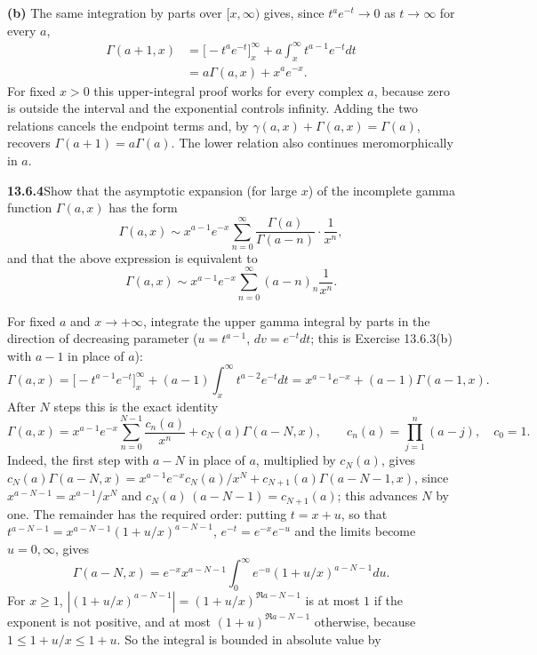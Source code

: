 \textbf{(b)} The same integration by parts over $[x,\infty)$
gives, since $t^ae^{-t}\to0$ as $t\to\infty$ for every $a$,
\begin{align*}
\Gamma(a+1,x)
&=\bigl[-t^ae^{-t}\bigr]_x^\infty
+a\int_x^\infty t^{a-1}e^{-t}dt\\
&=\boxed{a\Gamma(a,x)+x^ae^{-x}}.
\end{align*}
For fixed $x>0$ this upper-integral proof works for every
complex $a$, because zero is outside the interval and the
exponential controls infinity.  Adding the two relations cancels
the endpoint terms and, by $\gamma(a,x)+\Gamma(a,x)=\Gamma(a)$,
recovers $\Gamma(a+1)=a\Gamma(a)$.
The lower relation also continues meromorphically in $a$.


\par\bigskip
\noindent\textbf{13.6.4}\quad Show that the asymptotic expansion (for large
$x$) of the incomplete gamma function $\Gamma(a,x)$ has the form
\[
\Gamma(a,x)\sim x^{a-1}e^{-x}\sum_{n=0}^{\infty}
\frac{\Gamma(a)}{\Gamma(a-n)}\cdot\frac{1}{x^{n}},
\]
and that the above expression is equivalent to
\[
\Gamma(a,x)\sim x^{a-1}e^{-x}\sum_{n=0}^{\infty}
(a-n)_{n}\frac{1}{x^{n}}.
\]
\par\smallskip
{}
\solution
For fixed $a$ and $x\to+\infty$, integrate the upper gamma
integral by parts in the direction of decreasing parameter
($u=t^{a-1}$, $dv=e^{-t}dt$; this is Exercise 13.6.3(b) with
$a-1$ in place of $a$):
\[
\Gamma(a,x)=\bigl[-t^{a-1}e^{-t}\bigr]_x^\infty
+(a-1)\int_x^\infty t^{a-2}e^{-t}dt
=x^{a-1}e^{-x}+(a-1)\Gamma(a-1,x).
\]
After $N$ steps this is the exact identity
\[
\Gamma(a,x)=x^{a-1}e^{-x}\sum_{n=0}^{N-1}\frac{c_n(a)}{x^n}
+c_N(a)\Gamma(a-N,x),
\qquad c_n(a)=\prod_{j=1}^n(a-j),\quad c_0=1.
\]
Indeed, the first step with $a-N$ in place of $a$, multiplied by
$c_N(a)$, gives
$c_N(a)\Gamma(a-N,x)=x^{a-1}e^{-x}c_N(a)/x^N
+c_{N+1}(a)\Gamma(a-N-1,x)$,
since $x^{a-N-1}=x^{a-1}/x^N$ and $c_N(a)\,(a-N-1)=c_{N+1}(a)$;
this advances $N$ by one.
The remainder has the required order: putting $t=x+u$,
so that $t^{a-N-1}=x^{a-N-1}(1+u/x)^{a-N-1}$,
$e^{-t}=e^{-x}e^{-u}$ and the limits become $u=0,\infty$,
gives
\[
\Gamma(a-N,x)=e^{-x}x^{a-N-1}
\int_0^\infty e^{-u}(1+u/x)^{a-N-1}du.
\]
For $x\ge1$, $|(1+u/x)^{a-N-1}|=(1+u/x)^{\Re a-N-1}$ is at most
$1$ if the exponent is not positive, and at most
$(1+u)^{\Re a-N-1}$ otherwise, because $1\le1+u/x\le1+u$.
So the integral is bounded in absolute value by
